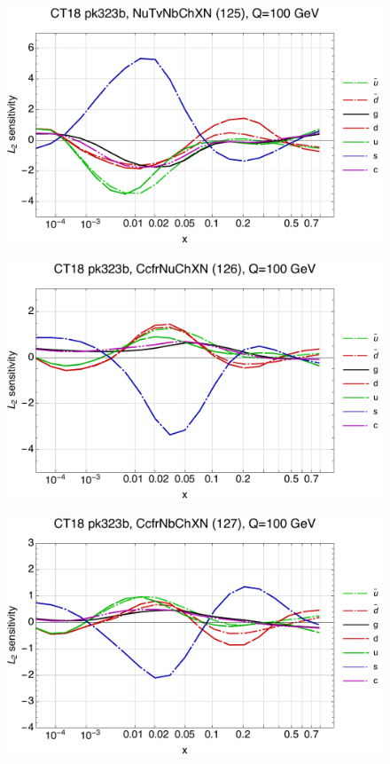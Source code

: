 \documentclass[10pt,aps,prd,floatfix,titlepage]{revtex4}
\begin{document}
\clearpage
\begin{figure}
\includegraphics[width=\textwidth,height=0.44\textheight,keepaspectratio]{1/125_ct18nn_L2_q100_Sf_1.pdf}
\caption{}
\end{figure}
\begin{figure}
\includegraphics[width=\textwidth,height=0.44\textheight,keepaspectratio]{1/126_ct18nn_L2_q100_Sf_1.pdf}
\caption{}
\end{figure}
\clearpage
\begin{figure}
\includegraphics[width=\textwidth,height=0.44\textheight,keepaspectratio]{1/127_ct18nn_L2_q100_Sf_1.pdf}
\caption{}
\end{figure}
\end{document}
